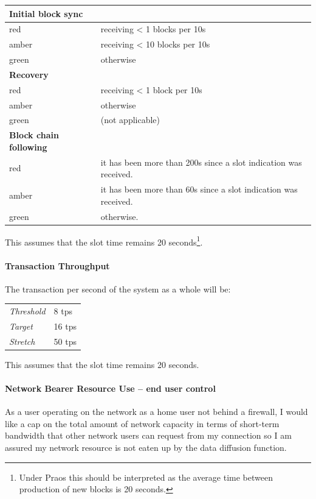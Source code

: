 \documentclass[11pt,a4paper]{article}
\begin{document}
\begin{longtable}[]{p{4cm}p{8cm}}
\toprule
\textbf{Initial block sync} &\tabularnewline
\endhead
red & receiving \textless{} 1 blocks per 10s\tabularnewline
amber & receiving \textless{} 10 blocks per 10s\tabularnewline
green & otherwise\tabularnewline
\midrule
\textbf{Recovery} &\tabularnewline
red & receiving \textless{} 1 block per 10s\tabularnewline
amber & otherwise\tabularnewline
green & (not applicable)\tabularnewline
\midrule
\textbf{Block chain following} &\tabularnewline
red & it has been more than 200s since a slot indication was
received.\tabularnewline
amber & it has been more than 60s since a slot indication was
received.\tabularnewline
green & otherwise.\tabularnewline
\bottomrule
\end{longtable}

This assumes that the slot time remains 20 seconds\footnote{Under Praos
  this should be interpreted as the average time between production of
  new blocks is 20 seconds.}.

\paragraph{Transaction Throughput}

The transaction per second of the system as a whole will be:

\begin{longtable}[]{@{}ll@{}}
\toprule
\emph{Threshold} & 8 tps\tabularnewline
\emph{Target} & 16 tps\tabularnewline
\emph{Stretch} & 50 tps\tabularnewline
\bottomrule
\end{longtable}

This assumes that the slot time remains 20 seconds.

\paragraph{Network Bearer Resource Use -- end user control}

As a user operating on the network as a home user not behind a firewall,
I would like a cap on the total amount of network capacity in terms of
short-term bandwidth that other network users can request from my
connection so I am assured my network resource is not eaten up by the
data diffusion function.
\end{document}
